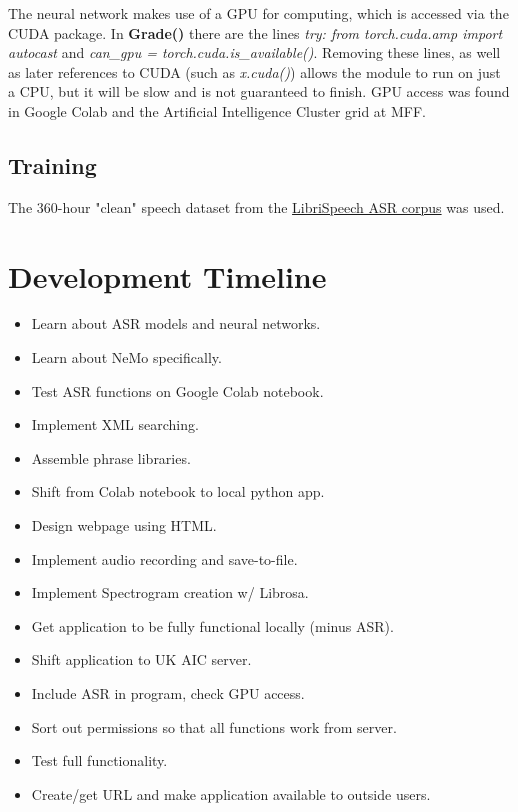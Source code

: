 \documentclass[12pt, letterpaper]{article}
\begin{document}
The neural network makes use of a GPU for computing, which is accessed via the CUDA package. In \textbf{Grade()} there are the lines \textit{try: from torch.cuda.amp import autocast} and \textit{can\_gpu = torch.cuda.is\_available()}. Removing these lines, as well as later references to CUDA (such as \textit{x.cuda()}) allows the module to run on just a CPU, but it will be slow and is not guaranteed to finish. GPU access was found in Google Colab and the Artificial Intelligence Cluster grid at MFF.

\subsection*{Training}
The 360-hour "clean" speech dataset from the \href{http://www.openslr.org/12/}{LibriSpeech ASR corpus} was used.


\section*{Development Timeline}
\begin{itemize}

\item{Learn about ASR models and neural networks.}
\item{Learn about NeMo specifically.}
\item{Test ASR functions on Google Colab notebook.}
\item{Implement XML searching.}
\item{Assemble phrase libraries.}
\item{Shift from Colab notebook to local python app.}
\item{Design webpage using HTML.}
\item{Implement audio recording and save-to-file.}
\item{Implement Spectrogram creation w/ Librosa.}
\item{Get application to be fully functional locally (minus ASR).}
\item{Shift application to UK AIC server.}
\item{Include ASR in program, check GPU access.}
\item{Sort out permissions so that all functions work from server.}
\item{Test full functionality.}
\item{Create/get URL and make application available to outside users.}

\end{itemize}
\newpage%
\end{document}

